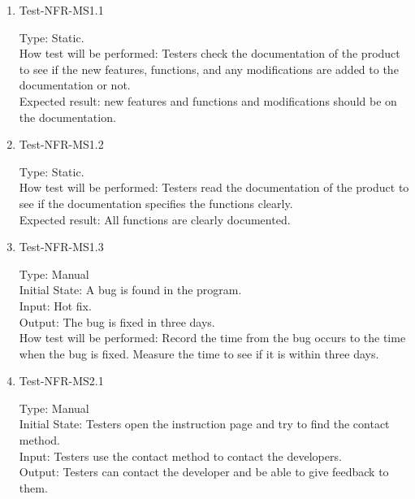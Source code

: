 \documentclass[12pt, titlepage]{article}
\begin{document}
\begin{enumerate}
\item{Test-NFR-MS1.1\\}

Type: Static.\\

How test will be performed: Testers check the documentation of the product to see if the new features, functions, and any modifications are added to the documentation or not.\\

Expected result: new features and functions and modifications should be on the documentation.

\item{Test-NFR-MS1.2\\}

Type: Static.\\

How test will be performed: Testers read the documentation of the product to see if the documentation specifies the functions clearly.\\

Expected result: All functions are clearly documented.

\item{Test-NFR-MS1.3\\} 

Type: Manual\\

Initial State: A bug is found in the program.\\

Input: Hot fix.\\

Output: The bug is fixed in three days.\\

How test will be performed: Record the time from the bug occurs to the time when the bug is fixed. Measure the time to see if it is within three days. 

\item{Test-NFR-MS2.1\\}

Type: Manual\\

Initial State: Testers open the instruction page and try to find the contact method.\\

Input: Testers use the contact method to contact the developers.\\

Output: Testers can contact the developer and be able to give feedback to them.\\


\end{enumerate}
\end{document}
